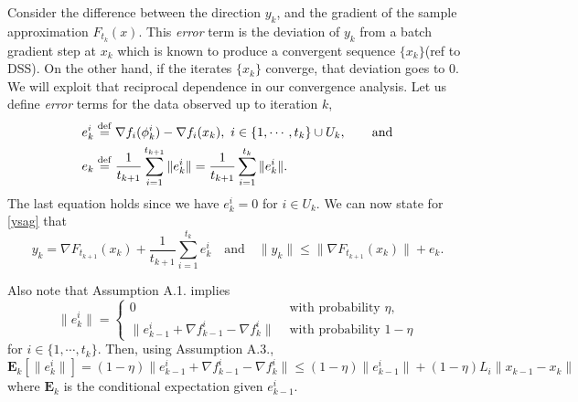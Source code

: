 \documentclass[11pt]{article}
\newcommand{\defeq}{\stackrel{\rm def}{=}}
\newcommand{\E}{\mathbf{E}}
\begin{document}
Consider the difference between the direction $y_k$, and the gradient of the sample approximation $F_{t_k}(x)$.  This \emph{error} term is the deviation of $y_k$ from a batch gradient step at $x_k$ which is known to produce a convergent sequence $\{x_k\}$(ref to DSS).  On the other hand, if the iterates $\{x_k\}$ converge, that deviation goes to 0. We will exploit that reciprocal dependence in our convergence analysis.  Let us define \emph{error} terms for the data observed up to iteration $k$,  
\begin{align}
 e_k^i &\defeq \nabla f_i(\phi_{k}^i)-\nabla f_i(x_k), \ i\in \{1,\cdots, t_k\}\cup U_k, \qquad \mbox{and}\\
 e_k &\defeq \frac{1}{t_{k+1}} \sum_{i=1}^{t_{k+1}} \|e_k^i\| = \frac{1}{t_{k+1}}\sum_{i=1}^{t_k}\|e_k^i\|\label{eq:defe}.
\end{align}
The last equation holds since we have $e_k^i=0$ for $i\in U_k$.  We can now state for \eqref{ysag} that
\begin{equation}\label{eq:y}
 y_k = \nabla F_{t_{k+1}}(x_k) + \frac{1}{t_{k+1}}\sum_{i=1}^{t_k} e_k^i \quad \mbox{and} \quad \|y_k\| \leq \|\nabla F_{t_{k+1}}(x_k)\| + e_k.
\end{equation}

Also note that Assumption A.1. implies
\[
\|e_k^i\| =
 \begin{cases}
  0  & \mbox{ with probability }\eta,\\
  \|e_{k-1}^i + \nabla f_{k-1}^i - \nabla f_k^i\| & \mbox{ with probability }1-\eta
 \end{cases}
\]
for $i\in \{1,\cdots,t_k\}$.  Then, using Assumption A.3., 
\begin{equation}\label{eq:expec}
 \E_k[\|e_k^i\|] = (1-\eta)\|e_{k-1}^i + \nabla f_{k-1}^i - \nabla f_k^i\| \leq (1-\eta)\|e_{k-1}^i\| + (1-\eta)L_i \|x_{k-1} - x_k\|
\end{equation}
where $\E_k$ is the conditional expectation given $e_{k-1}^i$.
\bigskip
\end{document}
